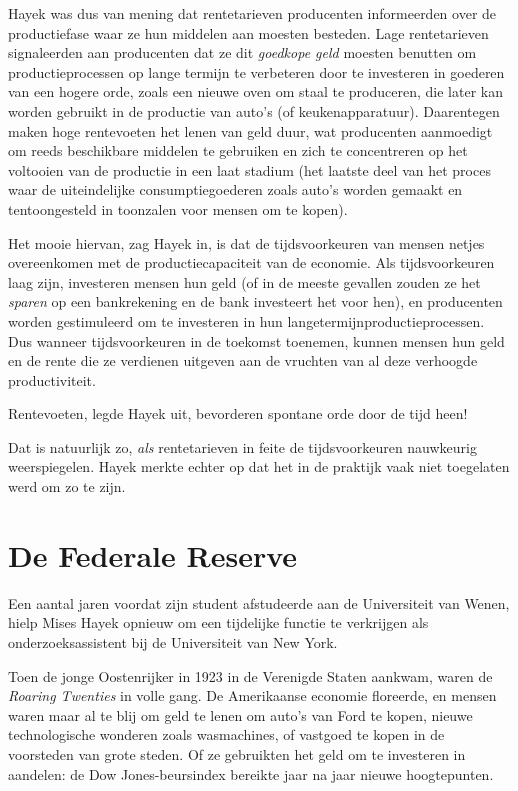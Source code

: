 \documentclass[
  a5paper,
  smalldemyvopaper,11pt,twoside,onecolumn,openright,extrafontsizes,
hidelinks]{memoir}
\begin{document}
Hayek was dus van mening dat rentetarieven producenten informeerden over
de productiefase waar ze hun middelen aan moesten besteden. Lage
rentetarieven signaleerden aan producenten dat ze dit \emph{goedkope
geld} moesten benutten om productieprocessen op lange termijn te
verbeteren door te investeren in goederen van een hogere orde, zoals een
nieuwe oven om staal te produceren, die later kan worden gebruikt in de
productie van auto's (of keukenapparatuur). Daarentegen maken hoge
rentevoeten het lenen van geld duur, wat producenten aanmoedigt om reeds
beschikbare middelen te gebruiken en zich te concentreren op het
voltooien van de productie in een laat stadium (het laatste deel van het
proces waar de uiteindelijke consumptiegoederen zoals auto's worden
gemaakt en tentoongesteld in toonzalen voor mensen om te kopen).

Het mooie hiervan, zag Hayek in, is dat de tijdsvoorkeuren van mensen
netjes overeenkomen met de productiecapaciteit van de economie. Als
tijdsvoorkeuren laag zijn, investeren mensen hun geld (of in de meeste
gevallen zouden ze het \emph{sparen} op een bankrekening en de bank
investeert het voor hen), en producenten worden gestimuleerd om te
investeren in hun langetermijnproductieprocessen. Dus wanneer
tijdsvoorkeuren in de toekomst toenemen, kunnen mensen hun geld en de
rente die ze verdienen uitgeven aan de vruchten van al deze verhoogde
productiviteit.

Rentevoeten, legde Hayek uit, bevorderen spontane orde door de tijd
heen!

Dat is natuurlijk zo, \emph{als} rentetarieven in feite de
tijdsvoorkeuren nauwkeurig weerspiegelen. Hayek merkte echter op dat het
in de praktijk vaak niet toegelaten werd om zo te zijn.

\section{De Federale Reserve}\label{de-federale-reserve}

Een aantal jaren voordat zijn student afstudeerde aan de Universiteit
van Wenen, hielp Mises Hayek opnieuw om een tijdelijke functie te
verkrijgen als onderzoeksassistent bij de Universiteit van New York.

Toen de jonge Oostenrijker in 1923 in de Verenigde Staten aankwam, waren
de \emph{Roaring Twenties} in volle gang. De Amerikaanse economie
floreerde, en mensen waren maar al te blij om geld te lenen om auto's
van Ford te kopen, nieuwe technologische wonderen zoals wasmachines, of
vastgoed te kopen in de voorsteden van grote steden. Of ze gebruikten
het geld om te investeren in aandelen: de Dow Jones-beursindex bereikte
jaar na jaar nieuwe hoogtepunten.
\end{document}

